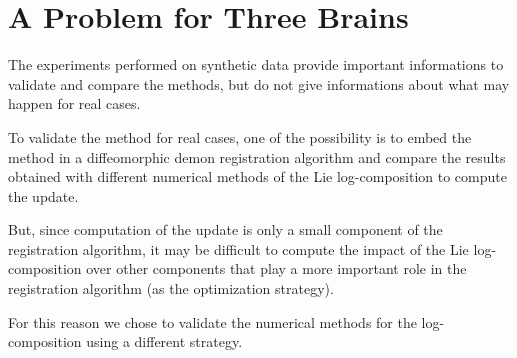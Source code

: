 \newpage

\section{A Problem for Three Brains}\label{se:three_brains} %
The experiments performed on synthetic data provide important informations to validate and compare the methods, but do not give informations about what may happen for real cases. 

To validate the method for real cases, one of the possibility is to embed the method in a diffeomorphic demon registration algorithm and compare the results obtained with different numerical methods of the Lie log-composition to compute the update.

But, since computation of the update is only a small component of the registration algorithm, it may be difficult to compute the impact of the Lie log-composition over other components that play a more important role in the registration algorithm (as the optimization strategy).

For this reason we chose to validate the numerical methods for the log-composition using a different strategy.

